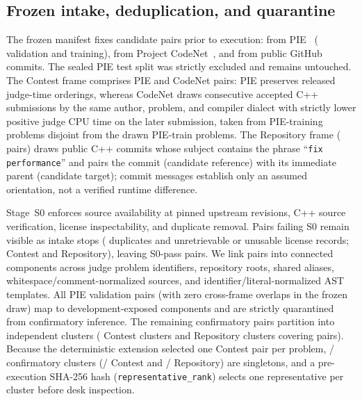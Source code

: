 \documentclass[11pt]{article}
\begin{document}
\subsection{Frozen intake, deduplication, and quarantine}

The frozen manifest fixes \BenchPairs{} candidate pairs prior to execution: \BenchPIE{} from PIE~\cite{shypula2024pie} (\BenchVal{} validation and \BenchTrain{} training), \BenchCodeNet{} from Project CodeNet~\cite{puri2021codenet}, and \BenchGitHub{} from public GitHub commits.
The sealed PIE test split was strictly excluded and remains untouched.
The Contest frame comprises \BenchContestPairs{} PIE and CodeNet pairs: PIE preserves released judge-time orderings, whereas CodeNet draws consecutive accepted C++ submissions by the same author, problem, and compiler dialect with strictly lower positive judge CPU time on the later submission, taken from \BenchCodeNet{} PIE-training problems disjoint from the \BenchTrain{} drawn PIE-train problems.
The Repository frame (\BenchGitHub{} pairs) draws public C++ commits whose subject contains the phrase ``\texttt{fix performance}'' and pairs the commit (candidate reference) with its immediate parent (candidate target); commit messages establish only an assumed orientation, not a verified runtime difference.

Stage~S0 enforces source availability at pinned upstream revisions, C++ source verification, license inspectability, and duplicate removal.
Pairs failing S0 remain visible as \BenchIntakeStopsN{} intake stops (\BenchIntakeDupN{} duplicates and \BenchIntakeUnretN{} unretrievable or unusable license records; \BenchIntakeContestN{} Contest and \BenchIntakeRepoN{} Repository), leaving \BenchSOPassN{} S0-pass pairs.
We link pairs into connected components across judge problem identifiers, repository roots, shared aliases, whitespace/comment-normalized sources, and identifier/literal-normalized AST templates.
All \BenchQuarPairsN{} PIE validation pairs (with zero cross-frame overlaps in the frozen draw) map to \BenchQuarClustersN{} development-exposed components and are strictly quarantined from confirmatory inference.
The remaining \BenchConfPairsN{} confirmatory pairs partition into \BenchConfClustersN{} independent clusters (\BenchConfContestClustersN{} Contest clusters and \BenchConfRepoClustersN{} Repository clusters covering \BenchConfRepoPairsN{} pairs).
Because the deterministic extension selected one Contest pair per problem, \BenchConfSingletonN{}/\BenchConfClustersN{} confirmatory clusters (\BenchConfContestClustersN{}/\BenchConfContestClustersN{} Contest and \BenchConfRepoSingletonN{}/\BenchConfRepoClustersN{} Repository) are singletons, and a pre-execution SHA-256 hash (\texttt{representative\_rank}) selects one representative per cluster before desk inspection.
\end{document}
